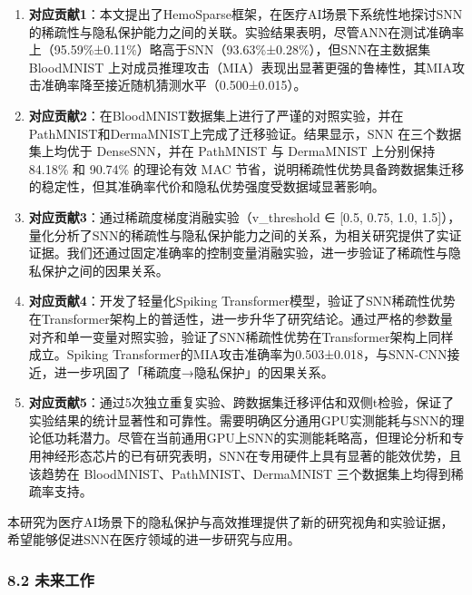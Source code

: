 \documentclass[
]{article}
\begin{document}
\begin{enumerate}
\def\labelenumi{\arabic{enumi}.}
\item
  \textbf{对应贡献1}：本文提出了HemoSparse框架，在医疗AI场景下系统性地探讨SNN的稀疏性与隐私保护能力之间的关联。实验结果表明，尽管ANN在测试准确率上（95.59\%±0.11\%）略高于SNN（93.63\%±0.28\%），但SNN在主数据集
  BloodMNIST
  上对成员推理攻击（MIA）表现出显著更强的鲁棒性，其MIA攻击准确率降至接近随机猜测水平（0.500±0.015）。
\item
  \textbf{对应贡献2}：在BloodMNIST数据集上进行了严谨的对照实验，并在PathMNIST和DermaMNIST上完成了迁移验证。结果显示，SNN
  在三个数据集上均优于 DenseSNN，并在 PathMNIST 与 DermaMNIST 上分别保持
  84.18\% 和 90.74\% 的理论有效 MAC
  节省，说明稀疏性优势具备跨数据集迁移的稳定性，但其准确率代价和隐私优势强度受数据域显著影响。
\item
  \textbf{对应贡献3}：通过稀疏度梯度消融实验（v\_threshold ∈ {[}0.5,
  0.75, 1.0,
  1.5{]}），量化分析了SNN的稀疏性与隐私保护能力之间的关系，为相关研究提供了实证证据。我们还通过固定准确率的控制变量消融实验，进一步验证了稀疏性与隐私保护之间的因果关系。
\item
  \textbf{对应贡献4}：开发了轻量化Spiking
  Transformer模型，验证了SNN稀疏性优势在Transformer架构上的普适性，进一步升华了研究结论。通过严格的参数量对齐和单一变量对照实验，验证了SNN稀疏性优势在Transformer架构上同样成立。Spiking
  Transformer的MIA攻击准确率为0.503±0.018，与SNN-CNN接近，进一步巩固了「稀疏度→隐私保护」的因果关系。
\item
  \textbf{对应贡献5}：通过5次独立重复实验、跨数据集迁移评估和双侧t检验，保证了实验结果的统计显著性和可靠性。需要明确区分通用GPU实测能耗与SNN的理论低功耗潜力。尽管在当前通用GPU上SNN的实测能耗略高，但理论分析和专用神经形态芯片的已有研究表明，SNN在专用硬件上具有显著的能效优势，且该趋势在
  BloodMNIST、PathMNIST、DermaMNIST 三个数据集上均得到稀疏率支持。
\end{enumerate}

本研究为医疗AI场景下的隐私保护与高效推理提供了新的研究视角和实验证据，希望能够促进SNN在医疗领域的进一步研究与应用。

\subsubsection{8.2 未来工作}\label{ux672aux6765ux5de5ux4f5c}
\end{document}
